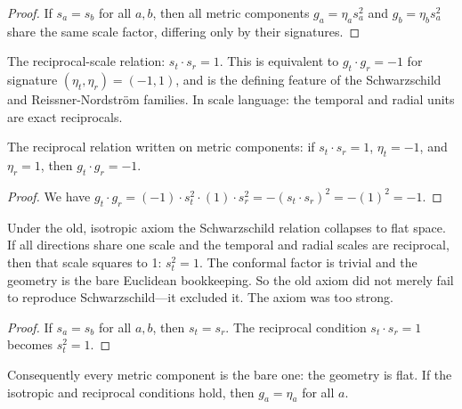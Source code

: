 \begin{proof}
If $s_a = s_b$ for all $a,b$, then all metric components $g_a = \eta_a s_a^2$ and $g_b = \eta_b s_a^2$ share the same scale factor, differing only by their signatures.
\end{proof}

\begin{definition}
The reciprocal-scale relation: $s_t \cdot s_r = 1$. This is equivalent to $g_t \cdot g_r = -1$ for signature $(\eta_t, \eta_r) = (-1, 1)$, and is the defining feature of the Schwarzschild and Reissner-Nordström families. In scale language: the temporal and radial units are exact reciprocals. 
\end{definition}

\begin{theorem}
The reciprocal relation written on metric components: if $s_t \cdot s_r = 1$, $\eta_t = -1$, and $\eta_r = 1$, then $g_t \cdot g_r = -1$. 
\end{theorem}

\begin{proof}
We have $g_t \cdot g_r = (-1)\cdot s_t^2 \cdot (1) \cdot s_r^2 = -(s_t \cdot s_r)^2 = -(1)^2 = -1$.
\end{proof}

\begin{theorem}
Under the old, isotropic axiom the Schwarzschild relation collapses to flat space. If all directions share one scale and the temporal and radial scales are reciprocal, then that scale squares to 1: $s_t^2 = 1$. The conformal factor is trivial and the geometry is the bare Euclidean bookkeeping. So the old axiom did not merely fail to reproduce Schwarzschild---it excluded it. The axiom was too strong. 
\end{theorem}

\begin{proof}
If $s_a = s_b$ for all $a,b$, then $s_t = s_r$. The reciprocal condition $s_t \cdot s_r = 1$ becomes $s_t^2 = 1$.
\end{proof}

\begin{theorem}
Consequently every metric component is the bare one: the geometry is flat. If the isotropic and reciprocal conditions hold, then $g_a = \eta_a$ for all $a$. 
\end{theorem}


